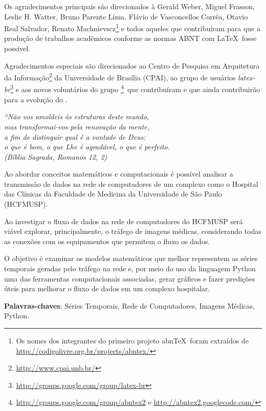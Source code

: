\documentclass[
	12pt,				%
	openright,			%
	twoside,			%
	a4paper,			%
	english,			%
	french,				%
	spanish,			%
	brazil				%
	]{abntex2}
\begin{document}
\begin{agradecimentos}
Os agradecimentos principais são direcionados à Gerald Weber, Miguel Frasson,
Leslie H. Watter, Bruno Parente Lima, Flávio de Vasconcellos Corrêa, Otavio Real
Salvador, Renato Machnievscz\footnote{Os nomes dos integrantes do primeiro
projeto abn\TeX\ foram extraídos de
\url{http://codigolivre.org.br/projects/abntex/}} e todos aqueles que
contribuíram para que a produção de trabalhos acadêmicos conforme
as normas ABNT com \LaTeX\ fosse possível.

Agradecimentos especiais são direcionados ao Centro de Pesquisa em Arquitetura
da Informação\footnote{\url{http://www.cpai.unb.br/}} da Universidade de
Brasília (CPAI), ao grupo de usuários
\emph{latex-br}\footnote{\url{http://groups.google.com/group/latex-br}} e aos
novos voluntários do grupo
\emph{\abnTeX}\footnote{\url{http://groups.google.com/group/abntex2} e
\url{http://abntex2.googlecode.com/}}~que contribuíram e que ainda
contribuirão para a evolução do \abnTeX.

\end{agradecimentos}

\begin{epigrafe}
    \vspace*{\fill}
	\begin{flushright}
		\textit{``Não vos amoldeis às estruturas deste mundo, \\
		mas transformai-vos pela renovação da mente, \\
		a fim de distinguir qual é a vontade de Deus: \\
		o que é bom, o que Lhe é agradável, o que é perfeito.\\
		(Bíblia Sagrada, Romanos 12, 2)}
	\end{flushright}
\end{epigrafe}


\setlength{\absparsep}{18pt} %
\begin{resumo}
Ao abordar conceitos matemáticos e computacionais é possível analisar a transmissão de dados na rede de computadores de um complexo como o Hospital das Clínicas da Faculdade
de Medicina da Universidade de São Paulo (HCFMUSP).

Ao investigar o fluxo de dados na rede de computadores do HCFMUSP será viável explorar, principalmente, o tráfego de imagens médicas, considerando todas as conexões com os equipamentos que permitem o fluxo os dados.

O objetivo é examinar os modelos matemáticos que melhor representem as séries temporais geradas pelo tráfego na rede e, por meio do uso da linguagem Python uma das ferramentas computacionais associadas, gerar gráficos e fazer predições úteis para melhorar o fluxo de dados em um complexo hospitalar.

 \textbf{Palavras-chaves}: Séries Temporais, Rede de Computadores, Imagens Médicas, Python.
\end{resumo}
\end{document}
